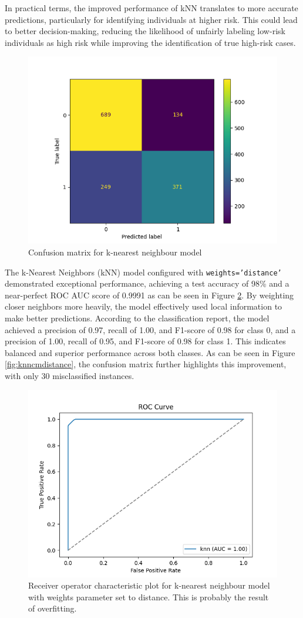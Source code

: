 In practical terms, the improved performance of kNN translates to more accurate predictions, particularly for identifying individuals at higher risk. This could lead to better decision-making, reducing the likelihood of unfairly labeling low-risk individuals as high risk while improving the identification of true high-risk cases. 	


\begin{figure}[H]
	\centering
	\includegraphics[width=0.7\linewidth]{img/knn_cm}
	\caption{Confusion matrix for k-nearest neighbour model}
	\label{fig:knncm}
\end{figure}



The k-Nearest Neighbors (kNN) model configured with \texttt{weights='distance'} demonstrated exceptional performance, achieving a test accuracy of 98\% and a near-perfect ROC AUC score of 0.9991 as can be seen in Figure \ref{fig:knnrocdistance}. By weighting closer neighbors more heavily, the model effectively used local information to make better predictions. According to the classification report, the model achieved a precision of 0.97, recall of 1.00, and F1-score of 0.98 for class 0, and a precision of 1.00, recall of 0.95, and F1-score of 0.98 for class 1. This indicates balanced and superior performance across both classes. As can be seen in Figure \ref{fig:knncmdistance}, the confusion matrix further highlights this improvement, with only 30 misclassified instances.

\begin{figure}[H]
	\centering
	\includegraphics[width=0.7\linewidth]{img/knn_roc_distance}
	\caption{Receiver operator characteristic plot for k-nearest neighbour model with weights parameter set to distance. This is probably the result of overfitting.}
	\label{fig:knnrocdistance}
\end{figure}

